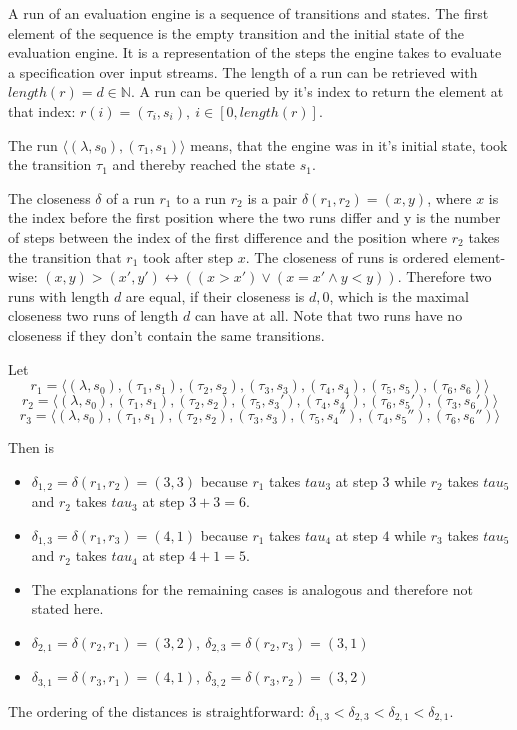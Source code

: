 A run of an evaluation engine is a sequence of transitions and states.
The first element of the sequence is the empty transition and the initial state of the evaluation engine.
It is a representation of the steps the engine takes to evaluate a specification over input streams.
The length of a run can be retrieved with \(\mathit{length}(r) = d \in \mathbb{N}\).
A run can be queried by it's index to return the element at that index: \(r(i)=(\tau_i, s_i),\ i \in [0, \mathit{length}(r)]\).

The run \(\langle (\lambda, s_0), (\tau_1, s_1) \rangle\) means, that the engine was in it's initial state, took the transition \(\tau_1\) and thereby reached the state \(s_1\).

\begin{definition}[name = Closeness of Runs]\label{def:runs_closeness}
  The closeness \(\delta\) of a run \(r_1\) to a run \(r_2\) is a pair \(\delta(r_1,r_2) = (x,y)\), where \(x\) is the index before the first position where the two runs differ and y is the number of steps between the index of the first difference and the position where \(r_2\) takes the transition that \(r_1\) took after step \(x\).
  The closeness of runs is ordered element-wise: \((x,y) > (x',y') \leftrightarrow ((x > x') \lor (x = x' \land y < y))\).
  Therefore two runs with length \(d\) are equal, if their closeness is \(d,0\), which is the maximal closeness two runs of length \(d\) can have at all.
  Note that two runs have no closeness if they don't contain the same transitions.
\end{definition}

\begin{exmp}[name = Closeness of Runs]
  Let
  \[r_1 = \langle (\lambda, s_0), (\tau_1,s_1), (\tau_2,s_2), (\tau_3,s_3), (\tau_4,s_4), (\tau_5,s_5), (\tau_6,s_6) \rangle\]
  \[r_2 = \langle (\lambda, s_0), (\tau_1,s_1), (\tau_2,s_2), (\tau_5,s_3'), (\tau_4,s_4'), (\tau_6,s_5'), (\tau_3,s_6') \rangle\]
  \[r_3 = \langle (\lambda, s_0), (\tau_1,s_1), (\tau_2,s_2), (\tau_3,s_3), (\tau_5,s_4''), (\tau_4,s_5''), (\tau_6,s_6'') \rangle\]

  Then is
  \begin{itemize}
    \item \(\delta_{1,2} = \delta(r_1,r_2) = (3,3)\) because \(r_1\) takes \(tau_3\) at step \(3\) while \(r_2\) takes \(tau_5\) and \(r_2\) takes \(tau_3\) at step \(3 + 3 = 6\).
    \item \(\delta_{1,3} = \delta(r_1,r_3) = (4,1)\) because \(r_1\) takes \(tau_4\) at step \(4\) while \(r_3\) takes \(tau_5\) and \(r_2\) takes \(tau_4\) at step \(4 + 1 = 5\).
    \item The explanations for the remaining cases is analogous and therefore not stated here.
    \item \(\delta_{2,1} = \delta(r_2,r_1) = (3,2),\ \delta_{2,3} = \delta(r_2,r_3) = (3,1)\)
    \item \(\delta_{3,1} = \delta(r_3,r_1) = (4,1),\ \delta_{3,2} = \delta(r_3,r_2) = (3,2)\)
  \end{itemize}
  The ordering of the distances is straightforward: \(\delta_{1,3} < \delta_{2,3} < \delta_{2,1} < \delta_{2,1}\).
\end{exmp}

